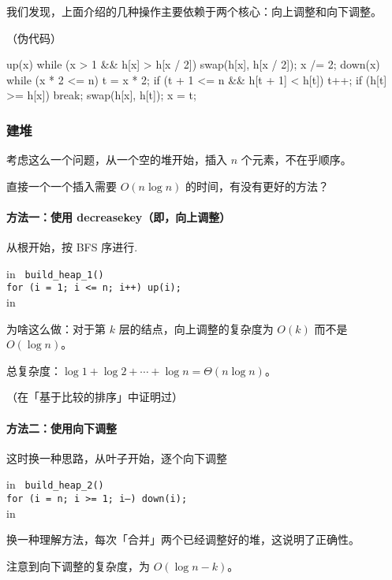 我们发现，上面介绍的几种操作主要依赖于两个核心：向上调整和向下调整。

（伪代码）

\begin{cppcode}
up(x) {
  while (x > 1 && h[x] > h[x / 2]) {
    swap(h[x], h[x / 2]);
    x /= 2;
  }
}
down(x) {
  while (x * 2 <= n) {
    t = x * 2;
    if (t + 1 <= n && h[t + 1] < h[t]) t++;
    if (h[t] >= h[x]) break;
    swap(h[x], h[t]);
    x = t;
  }
}
\end{cppcode}

\subsubsection{建堆}

考虑这么一个问题，从一个空的堆开始，插入 $n$ 个元素，不在乎顺序。

直接一个一个插入需要 $O(n \log n)$ 的时间，有没有更好的方法？

\paragraph{方法一：使用 decreasekey（即，向上调整）}

从根开始，按 BFS 序进行.

 in
\texttt{
build_heap_1() {\\	for (i = 1; i <= n; i++) up(i);\\}}
 in

为啥这么做：对于第 $k$ 层的结点，向上调整的复杂度为 $O(k)$ 而不是 $O(\log n)$。

总复杂度：$\log 1 + \log 2 + \cdots + \log n = \Theta(n \log n)$。

（在「基于比较的排序」中证明过）

\paragraph{方法二：使用向下调整}

这时换一种思路，从叶子开始，逐个向下调整

 in
\texttt{
build_heap_2() {\\	for (i = n; i >= 1; i--) down(i);\\}}
 in

换一种理解方法，每次「合并」两个已经调整好的堆，这说明了正确性。

注意到向下调整的复杂度，为 $O(\log n - k)$。


